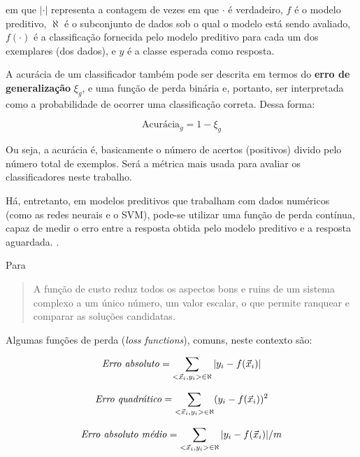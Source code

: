 em que $|\cdot|$ representa a contagem de vezes em que $\cdot$ é verdadeiro, $f$ é o modelo preditivo, $\aleph$ é o subconjunto de dados sob o qual o modelo está sendo avaliado, $f(\cdot)$ é a classificação fornecida pelo modelo preditivo para cada um dos exemplares (dos dados), e $y$ é a classe esperada como resposta. \cite[p. 129]{Boscarioli2017}

A acurácia de um classificador também pode ser descrita em termos do \textbf{erro de generalização} $\xi_g$, e uma função de perda binária e, portanto, ser interpretada como a probabilidade de ocorrer uma classificação correta. Dessa forma:

\begin{equation}
\textrm{Acurácia}_g=1 - \xi_g
\end{equation}

Ou seja, a acurácia é, basicamente o número de acertos (positivos) divido pelo número total de exemplos. Será a métrica mais usada para avaliar os classificadores neste trabalho.

Há, entretanto, em modelos preditivos que trabalham com dados numéricos (como as redes neurais e o SVM), pode-se utilizar uma função de perda contínua, capaz de medir o erro entre a resposta obtida pelo modelo preditivo e a resposta aguardada. \cite{Boscarioli2017} \cite{deep_learning_book_2019}.

Para \cite{nn_smithing_1999}
\begin{quote}
	A função de custo reduz todos os aspectos bons e ruins de um sistema complexo a um único número, um valor escalar, o que permite ranquear e comparar as soluções candidatas.
\end{quote}

Algumas funções de perda (\textit{loss functions}), comuns, neste contexto são: \cite{Boscarioli2017}

\begin{equation}\label{erro_absoluto}
	\textrm{\textit{Erro absoluto}}=\sum_{<\vec{x}_i, y_i> \in \aleph} |y_i - f(\vec{x}_i)|
\end{equation}

\begin{equation}\label{erro_quadratico}
\textrm{\textit{Erro quadrático}}=\sum_{<\vec{x}_i, y_i> \in \aleph} (y_i - f(\vec{x}_i))^2
\end{equation}

\begin{equation}\label{erro_absoluto_medio}
\textrm{\textit{Erro absoluto médio}}=\sum_{<\vec{x}_i, y_i> \in \aleph} |y_i - f(\vec{x}_i)|/m
\end{equation}


